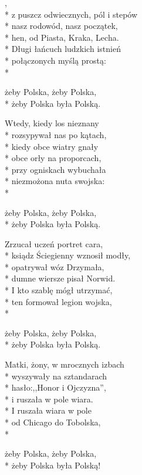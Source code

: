 \begin{lyrics}[longestline={Z głębi dziejów, z krain mrocznych,}]

,\\*
z puszcz odwiecznych, pól i stepów\\*
nasz rodowód, nasz początek,\\*
hen, od Piasta, Kraka, Lecha.\\*
Długi łańcuch ludzkich istnień\\*
połączonych myślą prostą:\\*
\begin{markverses}[atwidthof={żeby Polska, żeby Polska,}]%
żeby Polska, żeby Polska,\\*
żeby Polska była Polską.
\end{markverses}

Wtedy, kiedy los nieznany\\*
rozsypywał nas po kątach,\\*
kiedy obce wiatry gnały\\*
obce orły na proporcach,\\*
przy ogniskach wybuchała\\*
niezmożona nuta swojska:\\*
\begin{markverses}[atwidthof={żeby Polska, żeby Polska,}]%
żeby Polska, żeby Polska,\\*
żeby Polska była Polską.
\end{markverses}

Zrzucał uczeń portret cara,\\*
ksiądz Ściegienny wznosił modły,\\*
opatrywał wóz Drzymała,\\*
dumne wiersze pisał Norwid.\\*
I kto szablę mógł utrzymać,\\*
ten formował legion wojska,\\*
\begin{markverses}[atwidthof={żeby Polska, żeby Polska,}]%
żeby Polska, żeby Polska,\\*
żeby Polska była Polską.
\end{markverses}

Matki, żony, w mrocznych izbach\\*
wyszywały na sztandarach\\*
hasło:,,Honor i Ojczyzna'',\\*
i ruszała w pole wiara.\\*
I ruszała wiara w pole\\*
od Chicago do Tobolska,\\*
\begin{markverses}[atwidthof={żeby Polska, żeby Polska,}, marktext={\markstyle$\times4$}]%
żeby Polska, żeby Polska,\\*
żeby Polska była Polską!
\end{markverses}
\end{lyrics}



